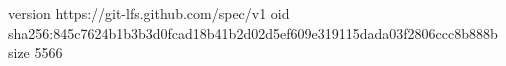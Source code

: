 version https://git-lfs.github.com/spec/v1
oid sha256:845c7624b1b3b3d0fcad18b41b2d02d5ef609e319115dada03f2806ccc8b888b
size 5566
